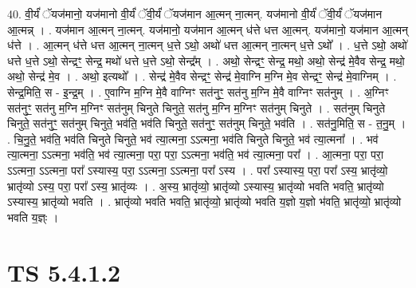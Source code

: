 \documentclass[17pt]{extarticle}
\begin{document}
40. वी॒र्यं॑ ॅयज॑मानो॒ यज॑मानो वी॒र्यं॑ ॅवी॒र्यं॑ ॅयज॑मान आ॒त्मन् ना॒त्मन्. यज॑मानो वी॒र्यं॑ ॅवी॒र्यं॑ ॅयज॑मान आ॒त्मन्न् । . यज॑मान आ॒त्मन् ना॒त्मन्. यज॑मानो॒ यज॑मान आ॒त्मन् ध॑त्ते धत्त आ॒त्मन्. यज॑मानो॒ यज॑मान आ॒त्मन् ध॑त्ते । . आ॒त्मन् ध॑त्ते धत्त आ॒त्मन् ना॒त्मन् ध॒त्ते ऽथो॒ अथो॑ धत्त आ॒त्मन् ना॒त्मन् ध॒त्ते ऽथो᳚ । . ध॒त्ते ऽथो॒ अथो॑ धत्ते ध॒त्ते ऽथो॒ सेन्द्रꣳ॒॒ सेन्द्र॒ मथो॑ धत्ते ध॒त्ते ऽथो॒ सेन्द्र᳚म् । . अथो॒ सेन्द्रꣳ॒॒ सेन्द्र॒ मथो॒ अथो॒ सेन्द्र॑ मे॒वैव सेन्द्र॒ मथो॒ अथो॒ सेन्द्र॑ मे॒व । . अथो॒ इत्यथो᳚ । . सेन्द्र॑ मे॒वैव सेन्द्रꣳ॒॒ सेन्द्र॑ मे॒वाग्नि म॒ग्नि मे॒व सेन्द्रꣳ॒॒ सेन्द्र॑ मे॒वाग्निम् । . सेन्द्र॒मिति॒ स - इ॒न्द्र॒म् । . ए॒वाग्नि म॒ग्नि मे॒वै वाग्निꣳ सत॑नुꣳ॒॒ सत॑नु म॒ग्नि मे॒वै वाग्निꣳ सत॑नुम् । . अ॒ग्निꣳ सत॑नुꣳ॒॒ सत॑नु म॒ग्नि म॒ग्निꣳ सत॑नुम् चिनुते चिनुते॒ सत॑नु म॒ग्नि म॒ग्निꣳ सत॑नुम् चिनुते । . सत॑नुम् चिनुते चिनुते॒ सत॑नुꣳ॒॒ सत॑नुम् चिनुते॒ भव॑ति॒ भव॑ति चिनुते॒ सत॑नुꣳ॒॒ सत॑नुम् चिनुते॒ भव॑ति । . सत॑नु॒मिति॒ स - त॒नु॒म् । . चि॒नु॒ते॒ भव॑ति॒ भव॑ति चिनुते चिनुते॒ भव॑ त्या॒त्मना॒ ऽऽत्मना॒ भव॑ति चिनुते चिनुते॒ भव॑ त्या॒त्मना᳚ । . भव॑ त्या॒त्मना॒ ऽऽत्मना॒ भव॑ति॒ भव॑ त्या॒त्मना॒ परा॒ परा॒ ऽऽत्मना॒ भव॑ति॒ भव॑ त्या॒त्मना॒ परा᳚ । . आ॒त्मना॒ परा॒ परा॒ ऽऽत्मना॒ ऽऽत्मना॒ परा᳚ ऽस्यास्य॒ परा॒ ऽऽत्मना॒ ऽऽत्मना॒ परा᳚ ऽस्य । . परा᳚ ऽस्यास्य॒ परा॒ परा᳚ ऽस्य॒ भ्रातृ॑व्यो॒ भ्रातृ॑व्यो ऽस्य॒ परा॒ परा᳚ ऽस्य॒ भ्रातृ॑व्यः । . अ॒स्य॒ भ्रातृ॑व्यो॒ भ्रातृ॑व्यो ऽस्यास्य॒ भ्रातृ॑व्यो भवति भवति॒ भ्रातृ॑व्यो ऽस्यास्य॒ भ्रातृ॑व्यो भवति । . भ्रातृ॑व्यो भवति भवति॒ भ्रातृ॑व्यो॒ भ्रातृ॑व्यो भवति य॒ज्ञो य॒ज्ञो भ॑वति॒ भ्रातृ॑व्यो॒ भ्रातृ॑व्यो भवति य॒ज्ञ्ः । \newline
\pagebreak
{}

\section{ TS 5.4.1.2 }
\end{document}
